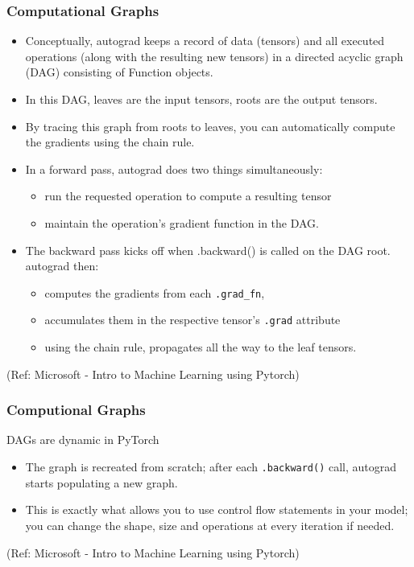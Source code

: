 \begin{frame}[fragile] \frametitle{Computational Graphs}


\begin{itemize}
\item Conceptually, autograd keeps a record of data (tensors) and all executed operations (along with the resulting new tensors) in a directed acyclic graph (DAG) consisting of Function objects. 
\item In this DAG, leaves are the input tensors, roots are the output tensors. 
\item By tracing this graph from roots to leaves, you can automatically compute the gradients using the chain rule.
\item In a forward pass, autograd does two things simultaneously:
	\begin{itemize}
	\item run the requested operation to compute a resulting tensor
	\item maintain the operation’s gradient function in the DAG.
	\end{itemize}
\item The backward pass kicks off when .backward() is called on the DAG root. autograd then:
	\begin{itemize}
	\item computes the gradients from each \lstinline|.grad_fn|,
	\item accumulates them in the respective tensor’s \lstinline|.grad| attribute
	\item using the chain rule, propagates all the way to the leaf tensors.
	\end{itemize}

\end{itemize}


\tiny{(Ref: Microsoft - Intro to Machine Learning using Pytorch)}
\end{frame}

\begin{frame}[fragile] \frametitle{Computional Graphs}
DAGs are dynamic in PyTorch

\begin{itemize}
\item The graph is recreated from scratch; after each \lstinline|.backward()| call, autograd starts populating a new graph. 
\item This is exactly what allows you to use control flow statements in your model; you can change the shape, size and operations at every iteration if needed.
\end{itemize}


\tiny{(Ref: Microsoft - Intro to Machine Learning using Pytorch)}
\end{frame}

